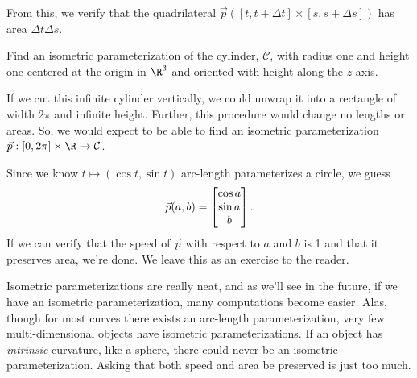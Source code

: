 \begin{example}
\begin{center}
	\end{center}

	From this, we verify that the quadrilateral $\vec p([t,t+\Delta t]\times[s,s+\Delta s])$ has area $\Delta t\Delta s$.
\end{example}

\begin{example}
	Find an isometric parameterization of the cylinder, $\mathcal C$, with radius one and height one centered at
	the origin in $\R^3$ and oriented with height along the $z$-axis.

	If we cut this infinite cylinder vertically, we could unwrap it into
	a rectangle of width $2\pi$ and infinite height.  Further, this procedure would
	change no lengths or areas.  So, we would expect to be able to find an isometric
	parameterization $\vec p:[0,2\pi]\times\R\to\mathcal C$.

	Since we know $t\mapsto (\cos t,\sin t)$ arc-length parameterizes a circle, we guess
	\[
		\vec p(a,b) = \begin{bmatrix}\cos a\\\sin a\\b\end{bmatrix}.
	\]
	If we can verify that the speed of $\vec p$ with respect to $a$ and $b$ is 1 and that
	it preserves area, we're done.  We leave this as an exercise to the reader.
\end{example}

Isometric parameterizations are really neat, and as we'll see in the future, if we have an isometric
parameterization, many computations become easier.  Alas, though for most curves there exists
an arc-length parameterization, very few multi-dimensional objects have isometric parameterizations.
If an object has \emph{intrinsic} curvature, like a sphere, there could never be an isometric parameterization.
Asking that both speed and area be preserved is just too much.

